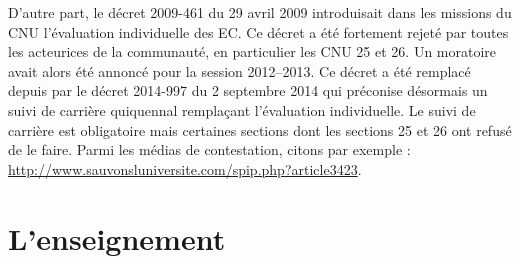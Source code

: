 D'autre part, le d\'ecret 2009-461 du 29 avril 2009 introduisait dans les missions du CNU l'\'evaluation individuelle des EC. 
Ce d\'ecret a \'et\'e fortement rejet\'e par tou\mp te\mp s les acteur\mp ice\mp s de la communaut\'e, en particulier les CNU 25 et 26.
Un moratoire avait alors \'et\'e annonc\'e pour la session 2012--2013. 
Ce d\'ecret a \'et\'e remplac\'e depuis par le d\'ecret 2014-997 du 2 septembre 2014 qui pr\'econise
d\'esormais un \og suivi de carri\`ere\fg{} quiquennal rempla\c{c}ant l'\'evaluation individuelle. Le suivi de carri\`ere est obligatoire mais certaines sections dont les sections 25 et 26 ont refus\'e de le faire. Parmi les m\'edias de contestation, citons par exemple : \url{http://www.sauvonsluniversite.com/spip.php?article3423}.

% 
% 
% 
% 
% 



\section{L'enseignement}
\label{enseignement}

